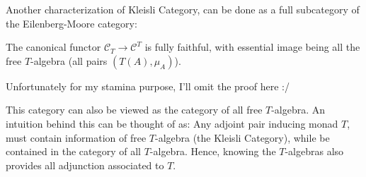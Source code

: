 \documentclass{article}
\begin{document}
Another characterization of Kleisli Category, can be done as a full subcategory of the Eilenberg-Moore category:

\begin{lem}
    The canonical functor $\mathcal{C}_T\rightarrow\mathcal{C}^T$ is fully faithful, with essential image being all the free $T$-algebra (all pairs $(T(A),\mu_A)$).
\end{lem}

Unfortunately for my stamina purpose, I'll omit the proof here :/

This category can also be viewed as the category of all free $T$-algebra. An intuition behind this can be thought of as: Any adjoint pair inducing monad $T$, must contain information of free $T$-algebra (the Kleisli Category), while be contained in the category of all $T$-algebra. Hence, knowing the $T$-algebras also provides all adjunction associated to $T$.
\end{document}
